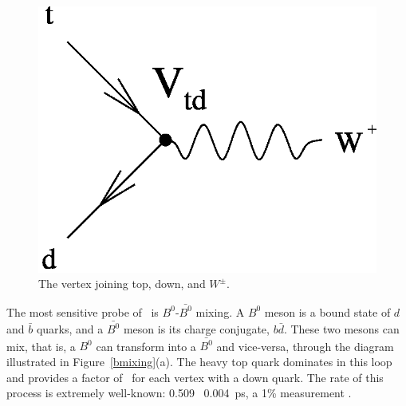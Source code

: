\documentclass{cornell}
\begin{document}
\begin{figure}[t]
  \begin{center}
    \includegraphics[width=0.4\linewidth]{vtdvertex}
  \end{center}
  \caption[Vertex joining top, down, and $W^\pm$]{\label{vtdvertex}
  The vertex joining top, down, and $W^\pm$.}
\end{figure}

The most sensitive probe of \vtd\ is $B^0$-$\bar{B^0}$ mixing.  A
$B^0$ meson is a bound state of $d$ and $\bar{b}$ quarks, and a
$\bar{B^0}$ meson is its charge conjugate, $b\bar{d}$.  These two
mesons can mix, that is, a $B^0$ can transform into a $\bar{B^0}$ and
vice-versa, through the diagram illustrated in
Figure~\ref{bmixing}(a).  The heavy top quark dominates in this loop
and provides a factor of \vtd\ for each vertex with a down quark.  The
rate of this process is extremely well-known: 0.509 \PM\ 0.004~ps\inv,
a 1\% measurement \cite{hfag}.
\end{document}
